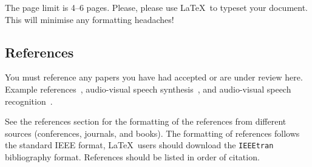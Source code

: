 \documentclass{cmppgr}
\begin{document}
The page limit is 4--6 pages. Please, please use \LaTeX\ to typeset your document. This will minimise any formatting headaches!

\subsection{References}

You must reference any papers you have had accepted or are under review here. Example references~\cite{massaro98:perceiving}, audio-visual speech synthesis~\cite{theobald04:specomm,theobald08:lips}, and audio-visual speech recognition~\cite{cox08:avsp,matthews2002:extraction}.

See the references section for the formatting of the references from different sources (conferences, journals, and books). The formatting of references follows the standard IEEE format, \LaTeX\ users should download the \texttt{IEEEtran} bibliography format. References should be listed in order of citation.



\end{document}
